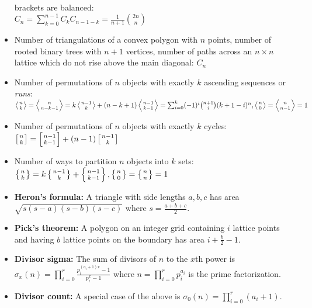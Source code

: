 \documentclass[9pt,a4paper,twocolumn,landscape,oneside]{amsart}
\begin{document}
\begin{itemize}
                brackets are balanced: \\ $C_n = \sum_{k=0}^{n-1} C_kC_{n-1-k}
                = \frac{1}{n+1}\binom{2n}n$
            \item Number of triangulations of a convex polygon with $n$ points,
                number of rooted binary trees with $n+1$ vertices, number of
                paths across an $n\times n$ lattice which do not rise above the
                main diagonal: $C_n$
            \item Number of permutations of $n$ objects with exactly $k$
                ascending sequences or {\it runs}: \\ $\left\langle {n \atop k}
                \right\rangle = \left\langle {n \atop n - k - 1} \right\rangle
                = k\left\langle {n - 1 \atop k} \right\rangle + (n - k +
                1)\left\langle {n-1 \atop k-1} \right\rangle =
                \sum_{i=0}^{k}(-1)^i \binom{n+1}{i} (k+1-i)^n, \left\langle {n
                \atop 0} \right\rangle = \left\langle {n \atop n -1}
                \right\rangle = 1$
            \item Number of permutations of $n$ objects with exactly $k$
                cycles: $\left[n \atop k\right] = \left[n-1 \atop k-1\right] +
                (n-1)\left[n-1 \atop k\right]$
            \item Number of ways to partition $n$ objects into $k$ sets:
                $\left\{n \atop k\right\} = k\left\{n-1 \atop k\right\} +
                \left\{n-1 \atop k-1\right\}, \left\{n\atop 0\right\} =
                \left\{n\atop n\right\} = 1$
            \item \textbf{Heron's formula:} A triangle with side lengths
                $a,b,c$ has area $\sqrt{s(s-a)(s-b)(s-c)}$ where $s =
                \frac{a+b+c}{2}$.
            \item \textbf{Pick's theorem:} A polygon on an integer grid
                containing $i$ lattice points and having $b$ lattice points on
                the boundary has area $i + \frac{b}{2} - 1$.
            \item \textbf{Divisor sigma:} The sum of divisors of $n$ to the
                $x$th power is $\sigma_x(n) = \prod_{i=0}^{r} \frac{p_i^{(a_i +
                1)x} - 1}{p_i^x - 1}$ where $n = \prod_{i=0}^r p_i^{a_i}$ is
                the prime factorization.
            \item \textbf{Divisor count:} A special case of the above is
                $\sigma_0(n) = \prod_{i=0}^r (a_i + 1)$.

\end{itemize}
\end{document}
